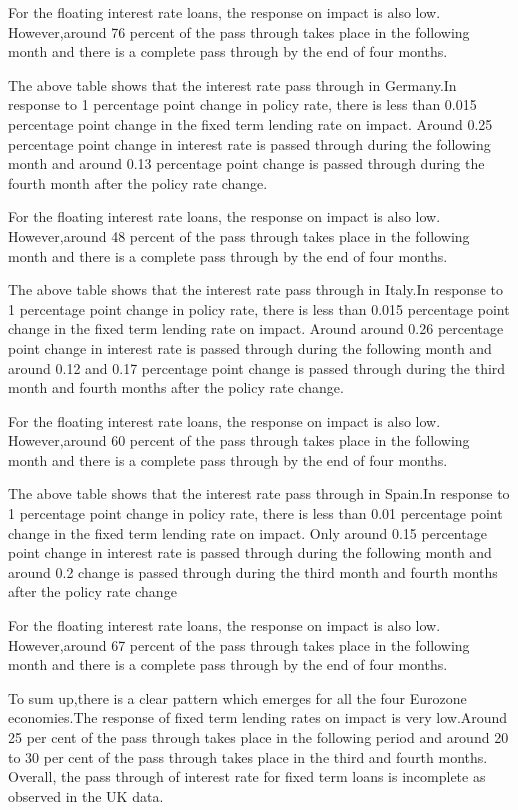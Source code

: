 \documentclass[12pt]{article}
\numberwithin{equation}{section}
\begin{document}
\begin{appendix}
For the floating interest rate loans, the response on impact is also low. However,around 76 percent of the pass through takes place in the following month and there is a complete pass through by the end of four months.



The above table shows that the interest rate pass through in Germany.In response to 1 percentage point change in policy rate, there is less than 0.015 percentage point change in the fixed term lending rate on impact.  Around 0.25 percentage point change in interest rate is passed through during the following month and around 0.13 percentage point change is passed through during the fourth month after the policy rate change.

For the floating interest rate loans, the response on impact is also low. However,around 48 percent of the pass through takes place in the following month and there is a complete pass through by the end of four months.


The above table shows that the interest rate pass through in Italy.In response to 1 percentage point change in policy rate, there is less than 0.015 percentage point change in the fixed term lending rate on impact.  Around around 0.26 percentage point change in interest rate is passed through during the following month and around 0.12 and 0.17 percentage point change is passed through during the third month and fourth months after the policy rate change.

For the floating interest rate loans, the response on impact is also low. However,around 60 percent of the pass through takes place in the following month and there is a complete pass through by the end of four months.



The above table shows that the interest rate pass through in Spain.In response to 1 percentage point change in policy rate, there is less than 0.01 percentage point change in the fixed term lending rate on impact.  Only around 0.15 percentage point change in interest rate is passed through during the following month and around 0.2  change is passed through during the third month and fourth months after the policy rate change

For the floating interest rate loans, the response on impact is also low. However,around 67 percent of the pass through takes place in the following month and there is a complete pass through by the end of four months.

To sum up,there is a clear pattern which emerges for all the four Eurozone economies.The response of fixed term lending rates on impact is very low.Around 25 per cent of the pass through takes place in the following period and around 20 to 30 per cent of the pass through takes place in the third and fourth months. Overall, the pass through of interest rate for fixed term loans is incomplete as observed in the UK data.


\end{appendix}
\end{document}

